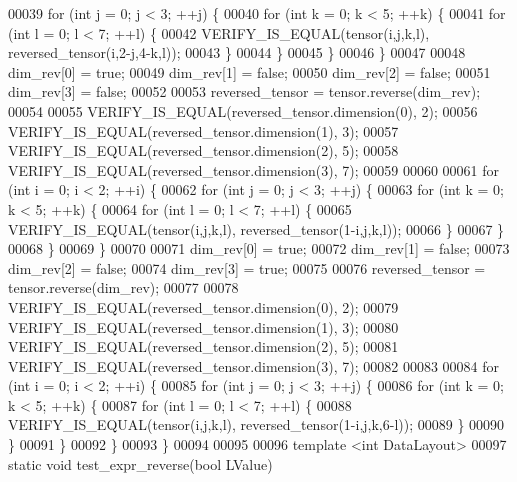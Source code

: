 \begin{DoxyCode}
00039     \textcolor{keywordflow}{for} (\textcolor{keywordtype}{int} j = 0; j < 3; ++j) \{
00040       \textcolor{keywordflow}{for} (\textcolor{keywordtype}{int} k = 0; k < 5; ++k) \{
00041         \textcolor{keywordflow}{for} (\textcolor{keywordtype}{int} l = 0; l < 7; ++l) \{
00042           VERIFY\_IS\_EQUAL(tensor(i,j,k,l), reversed\_tensor(i,2-j,4-k,l));
00043         \}
00044       \}
00045     \}
00046   \}
00047 
00048   dim\_rev[0] = \textcolor{keyword}{true};
00049   dim\_rev[1] = \textcolor{keyword}{false};
00050   dim\_rev[2] = \textcolor{keyword}{false};
00051   dim\_rev[3] = \textcolor{keyword}{false};
00052 
00053   reversed\_tensor = tensor.reverse(dim\_rev);
00054 
00055   VERIFY\_IS\_EQUAL(reversed\_tensor.dimension(0), 2);
00056   VERIFY\_IS\_EQUAL(reversed\_tensor.dimension(1), 3);
00057   VERIFY\_IS\_EQUAL(reversed\_tensor.dimension(2), 5);
00058   VERIFY\_IS\_EQUAL(reversed\_tensor.dimension(3), 7);
00059 
00060 
00061   \textcolor{keywordflow}{for} (\textcolor{keywordtype}{int} i = 0; i < 2; ++i) \{
00062     \textcolor{keywordflow}{for} (\textcolor{keywordtype}{int} j = 0; j < 3; ++j) \{
00063       \textcolor{keywordflow}{for} (\textcolor{keywordtype}{int} k = 0; k < 5; ++k) \{
00064         \textcolor{keywordflow}{for} (\textcolor{keywordtype}{int} l = 0; l < 7; ++l) \{
00065           VERIFY\_IS\_EQUAL(tensor(i,j,k,l), reversed\_tensor(1-i,j,k,l));
00066         \}
00067       \}
00068     \}
00069   \}
00070 
00071   dim\_rev[0] = \textcolor{keyword}{true};
00072   dim\_rev[1] = \textcolor{keyword}{false};
00073   dim\_rev[2] = \textcolor{keyword}{false};
00074   dim\_rev[3] = \textcolor{keyword}{true};
00075 
00076   reversed\_tensor = tensor.reverse(dim\_rev);
00077 
00078   VERIFY\_IS\_EQUAL(reversed\_tensor.dimension(0), 2);
00079   VERIFY\_IS\_EQUAL(reversed\_tensor.dimension(1), 3);
00080   VERIFY\_IS\_EQUAL(reversed\_tensor.dimension(2), 5);
00081   VERIFY\_IS\_EQUAL(reversed\_tensor.dimension(3), 7);
00082 
00083 
00084   \textcolor{keywordflow}{for} (\textcolor{keywordtype}{int} i = 0; i < 2; ++i) \{
00085     \textcolor{keywordflow}{for} (\textcolor{keywordtype}{int} j = 0; j < 3; ++j) \{
00086       \textcolor{keywordflow}{for} (\textcolor{keywordtype}{int} k = 0; k < 5; ++k) \{
00087         \textcolor{keywordflow}{for} (\textcolor{keywordtype}{int} l = 0; l < 7; ++l) \{
00088           VERIFY\_IS\_EQUAL(tensor(i,j,k,l), reversed\_tensor(1-i,j,k,6-l));
00089         \}
00090       \}
00091     \}
00092   \}
00093 \}
00094 
00095 
00096 \textcolor{keyword}{template} <\textcolor{keywordtype}{int} DataLayout>
00097 \textcolor{keyword}{static} \textcolor{keywordtype}{void} test\_expr\_reverse(\textcolor{keywordtype}{bool} LValue)

\end{DoxyCode}
